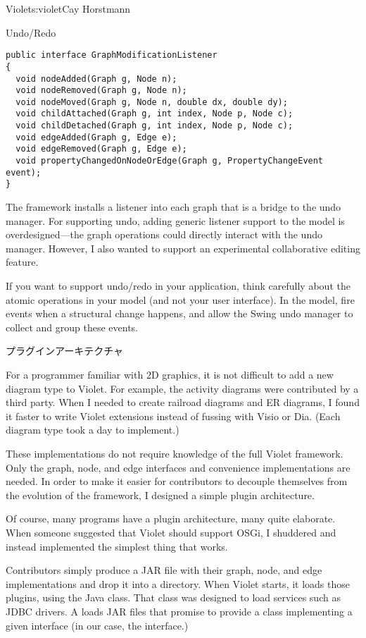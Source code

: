 \begin{aosachapter}{Violet}{s:violet}{Cay Horstmann}
\begin{aosasect1}{Undo/Redo}
\begin{verbatim}
public interface GraphModificationListener
{
  void nodeAdded(Graph g, Node n);
  void nodeRemoved(Graph g, Node n);
  void nodeMoved(Graph g, Node n, double dx, double dy);
  void childAttached(Graph g, int index, Node p, Node c);
  void childDetached(Graph g, int index, Node p, Node c);
  void edgeAdded(Graph g, Edge e);
  void edgeRemoved(Graph g, Edge e);
  void propertyChangedOnNodeOrEdge(Graph g, PropertyChangeEvent event);
}
\end{verbatim}

The framework installs a listener into each graph that is a bridge to
the undo manager. For supporting undo, adding generic listener support to 
the model is overdesigned---the graph operations could directly interact
with the undo manager. However, I also wanted to support an experimental
collaborative editing feature.

If you want to support undo/redo in your application, think carefully
about the atomic operations in your model (and not your user
interface).  In the model, fire events when a structural change
happens, and allow the Swing undo manager to collect and group these
events.

\end{aosasect1}

\begin{aosasect1}{プラグインアーキテクチャ}

For a programmer familiar with 2D graphics, it is not difficult to add
a new diagram type to Violet. For example, the activity diagrams were
contributed by a third party. When I needed to create railroad
diagrams and ER diagrams, I found it faster to write Violet extensions
instead of fussing with Visio or Dia. (Each diagram type took a day to
implement.)

These implementations do not require knowledge of the full Violet
framework.  Only the graph, node, and edge interfaces and convenience
implementations are needed. In order to make it easier for
contributors to decouple themselves from the evolution of the
framework, I designed a simple plugin architecture.

Of course, many programs have a plugin architecture, many quite
elaborate.  When someone suggested that Violet should support OSGi, I
shuddered and instead implemented the simplest thing that works.

Contributors simply produce a JAR file with their graph, node, and
edge implementations and drop it into a  directory. When
Violet starts, it loads those plugins, using the Java
 class. That class was designed to load services
such as JDBC drivers. A  loads JAR files that
promise to provide a class implementing a given interface (in our
case, the  interface.)


\end{aosasect1}
\end{aosachapter}
